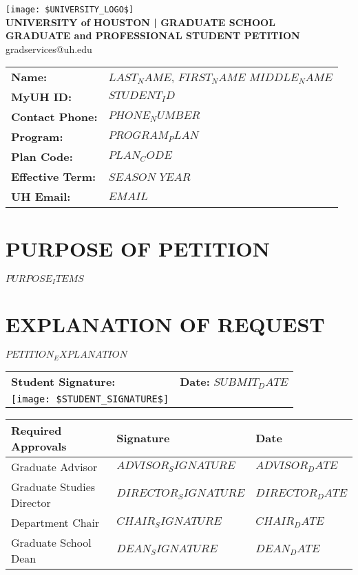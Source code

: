 \documentclass{article}
\begin{document}
\begin{center}
    \texttt{[image: \$UNIVERSITY\_LOGO\$]} \\
    \Large\textbf{UNIVERSITY of HOUSTON | GRADUATE SCHOOL} \\
    \large\textbf{GRADUATE and PROFESSIONAL STUDENT PETITION} \\
    \small gradservices@uh.edu
\end{center}

\vspace{0.5cm}

\begin{tabular}{ll}
    \textbf{Name:} & $LAST_NAME$, $FIRST_NAME$ $MIDDLE_NAME$ \\
    \textbf{MyUH ID:} & $STUDENT_ID$ \\
    \textbf{Contact Phone:} & $PHONE_NUMBER$ \\
    \textbf{Program:} & $PROGRAM_PLAN$ \\
    \textbf{Plan Code:} & $PLAN_CODE$ \\
    \textbf{Effective Term:} & $SEASON$ $YEAR$ \\
    \textbf{UH Email:} & $EMAIL$
\end{tabular}

\vspace{0.5cm}

\section*{PURPOSE OF PETITION}
\begin{itemize}
    $PURPOSE_ITEMS$
\end{itemize}

\section*{EXPLANATION OF REQUEST}
$PETITION_EXPLANATION$

\vspace{1cm}

\begin{tabular}{p{}p{}}
    \textbf{Student Signature:} & \textbf{Date:} $SUBMIT_DATE$ \\
    \texttt{[image: \$STUDENT\_SIGNATURE\$]} & \\
\end{tabular}

\vspace{1cm}
\begin{tabular}{|l|l|l|}
    \hline
    \textbf{Required Approvals} & \textbf{Signature} & \textbf{Date} \\
    \hline
    Graduate Advisor & $ADVISOR_SIGNATURE$ & $ADVISOR_DATE$ \\
    \hline
    Graduate Studies Director & $DIRECTOR_SIGNATURE$ & $DIRECTOR_DATE$ \\
    \hline
    Department Chair & $CHAIR_SIGNATURE$ & $CHAIR_DATE$ \\
    \hline
    Graduate School Dean & $DEAN_SIGNATURE$ & $DEAN_DATE$ \\
    \hline
\end{tabular}
\end{document}
